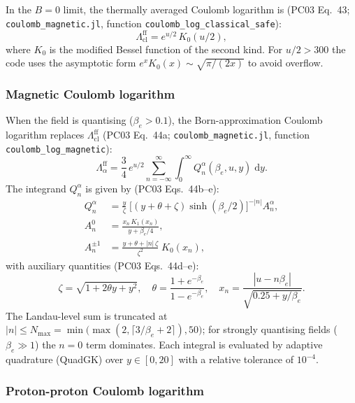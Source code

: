 \noindent
In the $B=0$ limit, the thermally averaged Coulomb logarithm is
(PC03 Eq.~43; \texttt{coulomb\_magnetic.jl}, function
\texttt{coulomb\_log\_classical\_safe}):
%
\begin{equation}
\label{eq:lambda_cl}
\Lambda_{\mathrm{cl}}^{\mathrm{ff}}
  = e^{u/2}\,K_0(u/2),
\end{equation}
%
where $K_0$ is the modified Bessel function of the second kind.  For
$u/2 > 300$ the code uses the asymptotic form
$e^x K_0(x) \sim \sqrt{\pi/(2x)}$ to avoid overflow.

\subsubsection{Magnetic Coulomb logarithm}
\label{sec:opacity:coulomb:magnetic}

\noindent
When the field is quantising ($\beta_e > 0.1$), the Born-approximation
Coulomb logarithm replaces $\Lambda_{\mathrm{cl}}^{\mathrm{ff}}$
(PC03 Eq.~44a; \texttt{coulomb\_magnetic.jl}, function
\texttt{coulomb\_log\_magnetic}):
%
\begin{equation}
\label{eq:lambda_mag}
\Lambda_\alpha^{\mathrm{ff}}
  = \frac{3}{4}\,e^{u/2}
    \sum_{n=-\infty}^{\infty}
    \int_0^\infty Q_n^\alpha(\beta_e,u,y)\;\mathrm{d}y.
\end{equation}
%
The integrand $Q_n^\alpha$ is given by (PC03 Eqs.~44b--e):
%
\begin{align}
Q_n^\alpha &= \frac{y}{\zeta}\;
  \bigl[(y+\theta+\zeta)\sinh(\beta_e/2)\bigr]^{-|n|}
  A_n^\alpha,
  \label{eq:Q_integrand}\\[4pt]
%
A_n^0 &= \frac{x_n\,K_1(x_n)}{y + \beta_e/4},
  \label{eq:A0}\\[4pt]
%
A_n^{\pm1} &= \frac{y + \theta + |n|\,\zeta}{\zeta^2}\;K_0(x_n),
  \label{eq:Apm1}
\end{align}
%
with auxiliary quantities (PC03 Eqs.~44d--e):
%
\begin{equation}
\label{eq:aux_mag_coulomb}
\zeta = \sqrt{1+2\theta y+y^2},\quad
\theta = \frac{1+e^{-\beta_e}}{1-e^{-\beta_e}},\quad
x_n = \frac{|u - n\beta_e|}{\sqrt{0.25 + y/\beta_e}}.
\end{equation}
%
The Landau-level sum is truncated at
$|n| \le N_{\max} = \min\!\bigl(\max(2,\lceil 3/\beta_e + 2\rceil),
50\bigr)$;
for strongly quantising fields ($\beta_e \gg 1$) the $n=0$ term
dominates.  Each integral is evaluated by adaptive quadrature (QuadGK)
over $y\in[0,20]$ with a relative tolerance of $10^{-4}$.

\subsubsection{Proton-proton Coulomb logarithm}
\label{sec:opacity:coulomb:pp}

